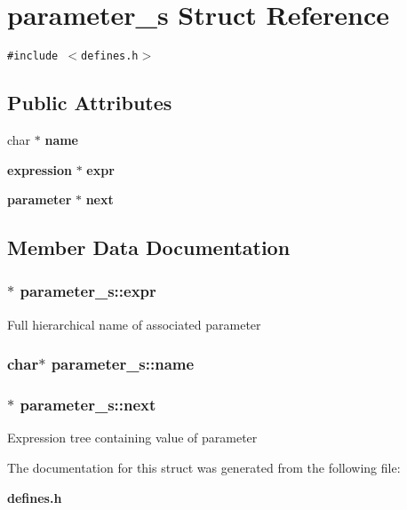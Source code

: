 \section{parameter\_\-s  Struct Reference}
\label{structparameter__s}
{\tt \#include $<$defines.h$>$}

\subsection*{Public Attributes}
\begin{CompactItemize}
\item 
char $\ast$ {\bf name}
\item 
{\bf expression} $\ast$ {\bf expr}
\item 
{\bf parameter} $\ast$ {\bf next}
\end{CompactItemize}


\subsection{Member Data Documentation}
\subsubsection{$\ast$ parameter\_\-s::expr}\label{structparameter__s_m1}


Full hierarchical name of associated parameter 
\subsubsection{\setlength{\rightskip}{0pt plus 5cm}char$\ast$ parameter\_\-s::name}\label{structparameter__s_m0}


\subsubsection{$\ast$ parameter\_\-s::next}\label{structparameter__s_m2}


Expression tree containing value of parameter 

The documentation for this struct was generated from the following file:\begin{CompactItemize}
\item 
{\bf defines.h}\end{CompactItemize}
